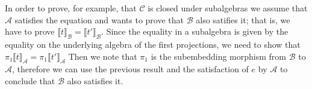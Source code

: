 \newcommand{\sem}[2]{\llbracket #1 \rrbracket_{\mathcal{#2}}} In order
to prove, for example, that $\mathcal{C}$ is closed under subalgebras
we assume that $\mathcal{A}$ satisfies the equation and wants to prove
that $\mathcal{B}$ also satifies it; that is, we have to prove
$\sem{t}{B} = \sem{t'}{B}$. Since the equality in a subalgebra is
given by the equality on the underlying algebra of the first
projections, we need to show that $\pi₁ \sem{t}{A} = \pi_1\sem{t'}{A}$
Then we note that $\pi_1$ is the subembedding morphism from $\mathcal{B}$ to
$\mathcal{A}$, therefore we can use the previous result and the satisfaction
of $e$ by $\mathcal{A}$ to conclude that $\mathcal{B}$ also satisfies it.
\begin{code}
\>[0][@{}l@{\AgdaIndent{0}}]%
\>[2]\AgdaSpace{}%
\AgdaSymbol{:}\AgdaSpace{}%
\AgdaSpace{}%
\AgdaSpace{}%
\AgdaSpace{}%
\<%
\\
%
\>[2]\AgdaSpace{}%
\AgdaSpace{}%
\AgdaSpace{}%
\AgdaSymbol{=}\AgdaSpace{}%
\<%
\\
\>[2][@{}l@{\AgdaIndent{0}}]%
\>[4]\AgdaSpace{}%
\AgdaSpace{}%
\AgdaSpace{}%
\AgdaSpace{}%
%
\>[24]\AgdaSpace{}%
\AgdaSpace{}%
\AgdaSymbol{(}\AgdaSpace{}%
\AgdaSymbol{(}\AgdaSpace{}%
\AgdaSymbol{))}\AgdaSpace{}%
\<%
\\
%
\>[4]\AgdaSpace{}%
\AgdaSpace{}%
\AgdaSpace{}%
%
\>[24]\AgdaSpace{}%
\AgdaSpace{}%
\AgdaSpace{}%
\AgdaSymbol{(}\AgdaSpace{}%
\AgdaSymbol{)}\AgdaSpace{}%
\<%
\\
%
\>[4]\AgdaSpace{}%
\AgdaSpace{}%
\AgdaSpace{}%
%
\>[24]\AgdaSpace{}%
\AgdaSpace{}%
\AgdaSymbol{(}\AgdaSpace{}%
\AgdaSymbol{)}\AgdaSpace{}%
\<%
\\
%
\>[4]\AgdaSpace{}%

\end{code}
